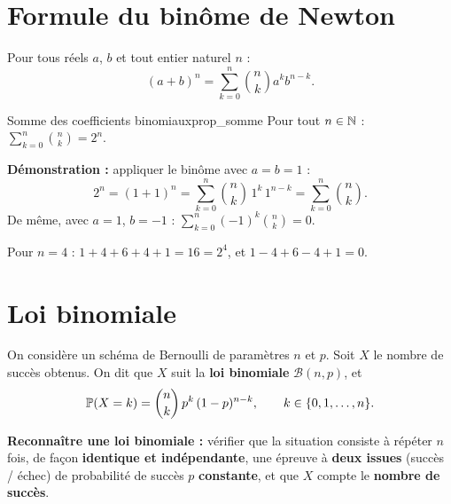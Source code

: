 \section{Formule du binôme de Newton}

\begin{theoreme}
	Pour tous réels $a$, $b$ et tout entier naturel $n$ :
	\[
	(a+b)^n = \sum_{k=0}^{n} \binom{n}{k} a^k b^{n-k}.
	\]
\end{theoreme}

\begin{propriete}{Somme des coefficients binomiaux}{prop_somme}
	Pour tout $n\in\mathbb{N}$ : $\displaystyle\sum_{k=0}^{n} \binom{n}{k} = 2^n$.
\end{propriete}

\begin{methode}
	\textbf{Démonstration :} appliquer le binôme avec $a=b=1$ :
	\[
	2^n = (1+1)^n = \sum_{k=0}^{n} \binom{n}{k}\,1^k\,1^{n-k}
	= \sum_{k=0}^{n} \binom{n}{k}.
	\]
	De même, avec $a=1$, $b=-1$ :
	$\displaystyle\sum_{k=0}^{n} (-1)^k\binom{n}{k} = 0$.
\end{methode}

\begin{exemple}
	Pour $n=4$ : $1+4+6+4+1 = 16 = 2^4$, et $1-4+6-4+1 = 0$.
\end{exemple}


\section{Loi binomiale}

\begin{definition}
	On considère un schéma de Bernoulli de paramètres $n$ et $p$. Soit $X$ le
	nombre de succès obtenus. On dit que $X$ suit la \textbf{loi binomiale}
	$\mathscr{B}(n,p)$, et
	\[
	\mathbb{P}(X=k) = \binom{n}{k}\,p^k\,(1-p)^{n-k}, \qquad k\in\{0,1,\ldots,n\}.
	\]
\end{definition}

\begin{methode}
	\textbf{Reconnaître une loi binomiale :} vérifier que la situation
	consiste à répéter $n$ fois, de façon \textbf{identique et indépendante},
	une épreuve à \textbf{deux issues} (succès / échec) de probabilité de
	succès $p$ \textbf{constante}, et que $X$ compte le \textbf{nombre de
	succès}.
\end{methode}

